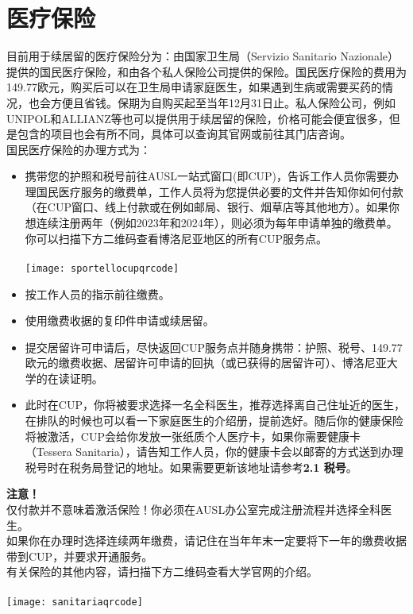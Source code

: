 \section{医疗保险}
目前用于续居留的医疗保险分为：由国家卫生局（Servizio Sanitario Nazionale）提供的国民医疗保险，和由各个私人保险公司提供的保险。国民医疗保险的费用为149.77欧元，购买后可以在卫生局申请家庭医生，如果遇到生病或需要买药的情况，也会方便且省钱。保期为自购买起至当年12月31日止。私人保险公司，例如UNIPOL和ALLIANZ等也可以提供用于续居留的保险，价格可能会便宜很多，但是包含的项目也会有所不同，具体可以查询其官网或前往其门店咨询。\\
国民医疗保险的办理方式为：
\begin{itemize}
\item 携带您的护照和税号前往AUSL一站式窗口(即CUP)，告诉工作人员你需要办理国民医疗服务的缴费单，工作人员将为您提供必要的文件并告知你如何付款（在CUP窗口、线上付款或在例如邮局、银行、烟草店等其他地方）。如果你想连续注册两年（例如2023年和2024年），则必须为每年申请单独的缴费单。你可以扫描下方二维码查看博洛尼亚地区的所有CUP服务点。\\
\\
\texttt{[image: sportellocupqrcode]}
\item 按工作人员的指示前往缴费。
\item 使用缴费收据的复印件申请或续居留。
\item 提交居留许可申请后，尽快返回CUP服务点并随身携带：护照、税号、149.77 欧元的缴费收据、居留许可申请的回执（或已获得的居留许可）、博洛尼亚大学的在读证明。
\item 此时在CUP，你将被要求选择一名全科医生，推荐选择离自己住址近的医生，在排队的时候也可以看一下家庭医生的介绍册，提前选好。随后你的健康保险将被激活，CUP会给你发放一张纸质个人医疗卡，如果你需要健康卡（Tessera Sanitaria），请告知工作人员，你的健康卡会以邮寄的方式送到办理税号时在税务局登记的地址。如果需要更新该地址请参考\textbf{2.1 税号}。
\end{itemize}
\textbf{注意！}\\
仅付款并不意味着激活保险！你必须在AUSL办公室完成注册流程并选择全科医生。\\
如果你在办理时选择连续两年缴费，请记住在当年年末一定要将下一年的缴费收据带到CUP，并要求开通服务。\\
有关保险的其他内容，请扫描下方二维码查看大学官网的介绍。\\
\\
\texttt{[image: sanitariaqrcode]}

